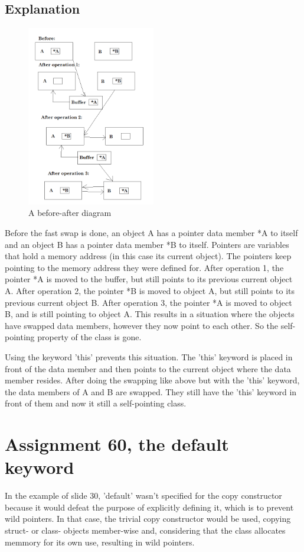 \documentclass[11pt]{article}
\begin{document}
\subsection*{Explanation}
\begin{figure}[!ht]
\caption{A before-after diagram}
\centering
\includegraphics[width=0.5\textwidth]{src/a59/a59.png}
\end{figure}

Before the fast swap is done, an object A has a pointer data member *A to itself and an object B has a pointer data member *B to itself.
Pointers are variables that hold a memory address (in this case its current object).
The pointers keep pointing to the memory address they were defined for.
After operation 1, the pointer *A is moved to the buffer, but still points to its previous current object A.
After operation 2, the pointer *B is moved to object A, but still points to its previous current object B.
After operation 3, the pointer *A is moved to object B, and is still pointing to object A.
This results in a situation where the objects have swapped data members, however they now point to each other.
So the self-pointing property of the class is gone.

Using the keyword 'this' prevents this situation.
The 'this' keyword is placed in front of the data member and then points to the current object where the data member resides.
After doing the swapping like above but with the 'this' keyword, the data members of A and B are swapped. They still have the 'this' keyword
in front of them and now it still a self-pointing class. 

\section*{Assignment 60, the default keyword}
In the example of slide 30, 'default' wasn't specified for the copy constructor because it would defeat the purpose of explicitly defining it, which is to prevent wild pointers. In that case, the trivial copy constructor would be used, copying struct- or class- objects member-wise and, considering that the class allocates memmory for its own use, resulting in wild pointers.
\end{document}
